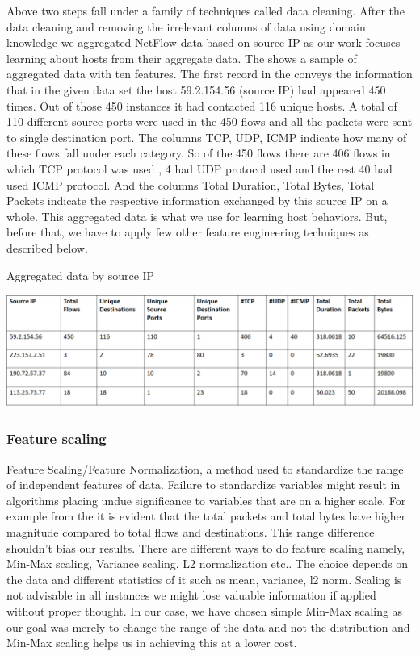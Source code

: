 Above two steps fall under a family of techniques called data cleaning. After the data cleaning and removing the irrelevant columns of data using domain knowledge we aggregated NetFlow data based on source IP as our work focuses learning about hosts from their aggregate data. The  shows a sample of aggregated data with ten features.
The first record in the  conveys the information that in the given data set the host 59.2.154.56 (source IP) had appeared 450 times. Out of those 450 instances it had contacted 116 unique hosts. A total of 110 different source ports were used in the 450 flows and all the packets were sent to single destination port. The columns TCP, UDP, ICMP indicate how many of these flows fall under each category. So of the 450 flows there are 406 flows in which TCP protocol was used , 4 had UDP protocol used and the rest 40 had used ICMP protocol. And the columns Total Duration, Total Bytes, Total Packets indicate the respective information exchanged by this source IP on a whole. This aggregated data is what we use for learning host behaviors. But, before that, we have to apply few other feature engineering techniques as described below.

\begin{table}[b]
	\caption{Aggregated data by source IP}%
	\centerline{\includegraphics[scale = 0.6]{aggregated.png}}	
\end{table}


\subsubsection{Feature scaling} 
Feature Scaling/Feature Normalization, a method used to standardize the range of independent features of data. Failure to standardize variables might result in algorithms placing undue significance to variables that are on a higher scale. For example from the  it is evident that the total packets and total bytes have higher magnitude compared to total flows and destinations. This range difference shouldn't bias our results.
There are different ways to do feature scaling namely, Min-Max scaling, Variance scaling, L2 normalization etc.. The choice depends on the data and different statistics of it such as mean, variance, l2 norm. Scaling is not advisable in all instances we might lose valuable information if applied without proper thought. In our case, we have chosen simple Min-Max scaling as our goal was merely to change the range of the data and not the distribution and Min-Max scaling helps us in achieving this at a lower cost.

